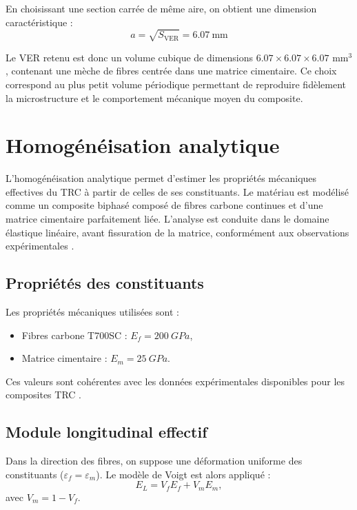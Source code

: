 \documentclass{rapportECL}
\begin{document}
En choisissant une section carrée de même aire, on obtient une dimension caractéristique :
\begin{equation}
a = \sqrt{S_{\text{VER}}} = 6.07 \ \text{mm}
\end{equation}

Le VER retenu est donc un volume cubique de dimensions $6.07 \times 6.07 \times 6.07$ mm$^3$, contenant une mèche de fibres centrée dans une matrice cimentaire. Ce choix correspond au plus petit volume périodique permettant de reproduire fidèlement la microstructure et le comportement mécanique moyen du composite.


\newpage

\section{Homogénéisation analytique}

L’homogénéisation analytique permet d’estimer les propriétés mécaniques effectives du TRC à partir de celles de ses constituants. Le matériau est modélisé comme un composite biphasé composé de fibres carbone continues et d’une matrice cimentaire parfaitement liée. L’analyse est conduite dans le domaine élastique linéaire, avant fissuration de la matrice, conformément aux observations expérimentales .

\subsection{Propriétés des constituants}

Les propriétés mécaniques utilisées sont :
\begin{itemize}
    \item Fibres carbone T700SC : $E_f = \SI{200}{GPa}$,
    \item Matrice cimentaire : $E_m = \SI{25}{GPa}$.
\end{itemize}

Ces valeurs sont cohérentes avec les données expérimentales disponibles pour les composites TRC \cite{Valeri2020,May2019}.

\subsection{Module longitudinal effectif}

Dans la direction des fibres, on suppose une déformation uniforme des constituants ($\varepsilon_f = \varepsilon_m$). Le modèle de Voigt est alors appliqué  :
\begin{equation}
E_L = V_f E_f + V_m E_m,
\end{equation}
avec $V_m = 1 - V_f$.
\end{document}
